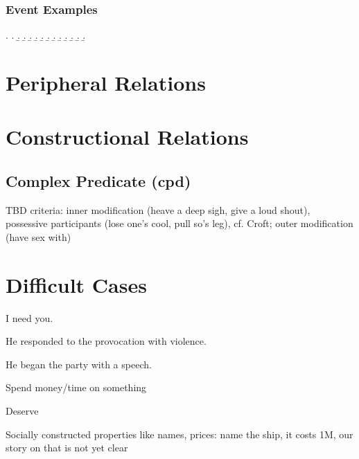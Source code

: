 \documentclass[a4paper]{article}
\begin{document}
\subsubsection{Event Examples}

\ex. \a. 
     \b. 
     \b. 
     \b. 
     \b. 
     \b. 
     \b. 
     \b. 
     \b. 
     \b. 
     \b. 
     \b. 
     \b. 

\clearpage
\section{Peripheral Relations}

\clearpage
\section{Constructional Relations}

\subsection{Complex Predicate (\textsf{cpd})}

TBD criteria: inner modification (heave a deep sigh, give a loud shout), possessive participants (lose one's cool, pull so's leg), cf. Croft; outer modification (have sex with)

\clearpage
\section{Difficult Cases}

I need you.

He responded to the provocation with violence.

He began the party with a speech.

Spend money/time on something

Deserve

Socially constructed properties like names, prices: name the ship, it costs 1M, our story on that is not yet clear

\clearpage


\end{document}
